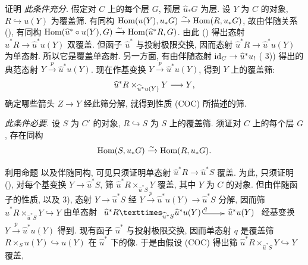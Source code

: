 \begin{enonce*}[remark]{证明}
\emph{此条件充分.} 假定对 $C$ 上的每个层 $G$, 预层 $\widehat{u}_{\ast}G$ 为层.
设 $Y$ 为 $C$ 的对象, $R\hookrightarrow u(Y)$ 为覆盖筛.
有同构 $\operatorname{Hom}(u(Y),u_{\ast}G)\xrightarrow{\sim}\operatorname{Hom}(R,u_{\ast}G)$,
故由伴随关系 (), 有同构
$\operatorname{Hom}(\widehat{u}^{\ast}\circ u(Y),G)\xrightarrow{\sim}\operatorname{Hom}(\widehat{u}^{\ast}R,G)$.
由此 () 得出态射
$\widehat{u}^{\ast}R\rightarrow \widehat{u}^{\ast}u(Y)$ 双覆盖.
但函子 $\widehat{u}^{\ast}$ 与投射极限交换, 因而态射
$\widehat{u}^{\ast}R\rightarrow \widehat{u}^{\ast}u(Y)$ 为单态射.
所以它是覆盖单态射. 另一方面, 有由伴随态射
$\operatorname{id}_C\rightarrow \widehat{u}^{\ast}u_{!}$\pageoriginale{}
( 3)) 得出的典范态射
$Y\xrightarrow{p}\widehat{u}^{\ast}u(Y)$.
现在作基变换 $Y\xrightarrow{p}\widehat{u}^{\ast}u(Y)$, 得到 $Y$ 上的覆盖筛:
$$
\widehat{u}^{\ast}R\times_{\widehat{u}^{\ast}u(Y)}Y\longrightarrow
Y{},
$$
确定哪些箭头 $Z\rightarrow Y$ 经此筛分解, 就得到性质 (COC) 所描述的筛.
\end{enonce*}

\emph{此条件必要.} 设 $S$ 为 $C'$ 的对象, $R\hookrightarrow S$ 为 $S$ 上的覆盖筛.
须证对 $C$ 上的每个层 $G$, 存在同构
$$
\operatorname{Hom}(S,u_{\ast}G)\xrightarrow{\sim} \operatorname{Hom}(R,u_{\ast}G){}.
$$

利用命题  以及伴随同构,
可见只须证明单态射 $\widehat{u}^{\ast}R\rightarrow \widehat{u}^{\ast}S$ 覆盖.
为此, 只须证明 (), 对每个基变换
$Y\rightarrow \widehat{u}^{\ast}S$, 筛
$\widehat{u}^{\ast}R\times_{\widehat{u}^{\ast}S}Y$ 覆盖,
其中 $Y$ 为 $C$ 的对象. 但由伴随函子的性质,
以及  3), 态射
$Y\rightarrow \widehat{u}^{\ast}S$ 经
$Y\xrightarrow{p}\widehat{u}^{\ast}u(Y)\rightarrow \widehat{u}^{\ast}S$ 分解,
因而筛 $\widehat{u}^{\ast}R\times_{\widehat{u}^{\ast}S}Y\hookrightarrow Y$
由单态射
$\xymatrix@1@M=.15cm{
\fprod{\hat{u}^{\ast}R}{\hat{u}^{\ast}u(Y)}{\hat{u}^{\ast}S}
\ar@{^{(}->}@<-1pt>[r]^(.6){q}&\hat{u}^{\ast}u(Y)}$
经基变换 $Y\xrightarrow{p}\widehat{u}^{\ast}u(Y)$ 得到.
现有函子 $\widehat{u}^{\ast}$ 与投射极限交换,
因而单态射 $q$ 是覆盖筛 $R\times_S u(Y)\hookrightarrow u(Y)$
在 $\widehat{u}^{\ast}$ 下的像. 于是由假设 (COC) 得出筛
$\widehat{u}^{\ast}R\times_{\widehat{u}^{\ast}S}Y\hookrightarrow Y$ 覆盖, \cqfd

